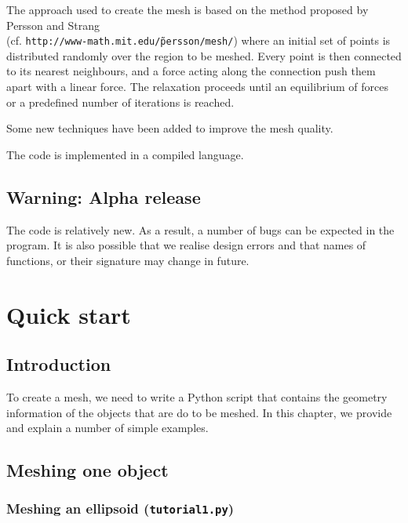 \documentclass[10pt,a4paper]{book}
\begin{document}
The approach used to create the mesh is based on the method proposed
by Persson and Strang \\
(cf. \texttt{http://www-math.mit.edu/\~persson/mesh/})
where an initial set of points is distributed randomly over the region
to be meshed. Every point is then connected to its nearest neighbours,
and a force acting along the connection push them apart with a linear
force. The relaxation proceeds until an equilibrium of forces or a
predefined number of iterations is reached.  

Some new techniques have been added to improve the mesh quality.

The code is implemented in a compiled language.

\section{Warning: Alpha release}
\label{sec:release}

The code is relatively new. As a result, a number of bugs can be
expected in the program. It is also possible that we realise design
errors and that names of functions, or their signature may change in
future.





\chapter{Quick start}

\section{Introduction}
To create a mesh, we need to write a Python script that contains the
geometry information of the objects that are do to be meshed. In this
chapter, we provide and explain a number of simple examples.

\section{Meshing one object}

\subsection{Meshing an ellipsoid (\texttt{tutorial1.py}) }
\label{sec:meshing-an-ellipsoid}
\end{document}
